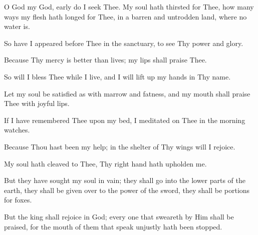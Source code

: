O God my God, early do I seek Thee. My soul hath thirsted for Thee, how many ways my flesh hath longed for Thee, in a barren and untrodden land, where no water is.

So have I appeared before Thee in the sanctuary, to see Thy power and glory.

Because Thy mercy is better than lives; my lips shall praise Thee.

So will I bless Thee while I live, and I will lift up my hands in Thy name.

Let my soul be satisfied as with marrow and fatness, and my mouth shall praise Thee with joyful lips.

If I have remembered Thee upon my bed, I meditated on Thee in the morning watches.

Because Thou hast been my help; in the shelter of Thy wings will I rejoice.

My soul hath cleaved to Thee, Thy right hand hath upholden me.

But they have sought my soul in vain; they shall go into the lower parts of the earth, they shall be given over to the power of the
sword, they shall be portions for foxes.

But the king shall rejoice in God; every one that sweareth by Him shall be praised, for the mouth of them that speak unjustly hath been stopped.
